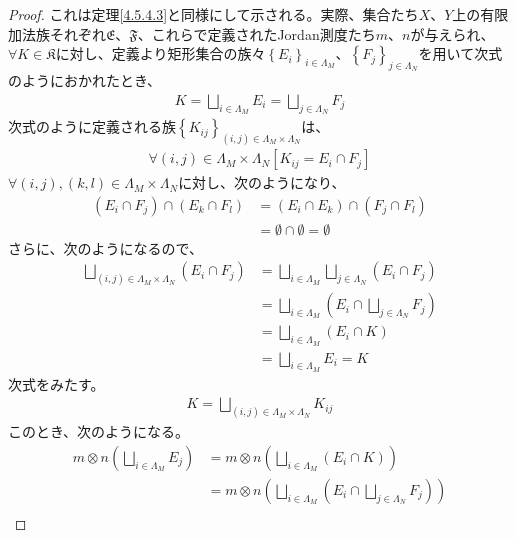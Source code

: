 \documentclass[dvipdfmx]{jsarticle}
\begin{document}
\begin{proof} これは定理\ref{4.5.4.3}と同様にして示される。実際、集合たち$X$、$Y$上の有限加法族それぞれ$\mathfrak{E}$、$\mathfrak{F}$、これらで定義されたJordan測度たち$m$、$n$が与えられ、$\forall K \in \mathfrak{K}$に対し、定義より矩形集合の族々$\left\{ E_{i} \right\}_{i \in \varLambda_{M}}$、$\left\{ F_{j} \right\}_{j \in \varLambda_{N}}$を用いて次式のようにおかれたとき、
\begin{align*}
K = \bigsqcup_{i \in \varLambda_{M}} E_{i} = \bigsqcup_{j \in \varLambda_{N}} F_{j}
\end{align*}
次式のように定義される族$\left\{ K_{ij} \right\}_{(i,j) \in \varLambda_{M} \times \varLambda_{N}}$は、
\begin{align*}
\forall(i,j) \in \varLambda_{M} \times \varLambda_{N}\left[ K_{ij} = E_{i} \cap F_{j} \right]
\end{align*}
$\forall(i,j),(k,l) \in \varLambda_{M} \times \varLambda_{N}$に対し、次のようになり、
\begin{align*}
\left( E_{i} \cap F_{j} \right) \cap \left( E_{k} \cap F_{l} \right) &= \left( E_{i} \cap E_{k} \right) \cap \left( F_{j} \cap F_{l} \right)\\
&= \emptyset \cap \emptyset = \emptyset
\end{align*}
さらに、次のようになるので、
\begin{align*}
\bigsqcup_{(i,j) \in \varLambda_{M} \times \varLambda_{N}} \left( E_{i} \cap F_{j} \right) &= \bigsqcup_{i \in \varLambda_{M}} {\bigsqcup_{j \in \varLambda_{N}} \left( E_{i} \cap F_{j} \right)}\\
&= \bigsqcup_{i \in \varLambda_{M}} \left( E_{i} \cap \bigsqcup_{j \in \varLambda_{N} } F_{j} \right)\\
&= \bigsqcup_{i \in \varLambda_{M}} \left( E_{i} \cap K \right)\\
&= \bigsqcup_{i \in \varLambda_{M}} E_{i} = K
\end{align*}
次式をみたす。
\begin{align*}
K = \bigsqcup_{(i,j) \in \varLambda_{M} \times \varLambda_{N}} K_{ij}
\end{align*}
このとき、次のようになる。
\begin{align*}
m \otimes n\left( \bigsqcup_{i \in \varLambda_{M}} E_{j} \right) &= m \otimes n\left( \bigsqcup_{i \in \varLambda_{M}} \left( E_{i} \cap K \right) \right)\\
&= m \otimes n\left( \bigsqcup_{i \in \varLambda_{M}} \left( E_{i} \cap \bigsqcup_{j \in \varLambda_{N} } F_{j} \right) \right)\\

\end{align*}
\end{proof}
\end{document}
